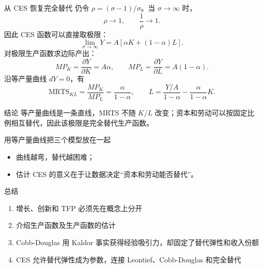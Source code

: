 \documentclass[aspectratio=32]{beamer}
\begin{document}
\begin{frame}{从 CES 恢复完全替代}
\small
\setlength{\abovedisplayskip}{3pt}
\setlength{\belowdisplayskip}{3pt}
仍令 $\rho=(\sigma-1)/\sigma$。当 $\sigma\to\infty$ 时，
\[
\rho\to1,\qquad \frac{1}{\rho}\to1.
\]
因此 CES 函数可以直接取极限：
\[
\lim_{\sigma\to\infty}Y
=A\left[\alpha K+(1-\alpha)L\right].
\]
对极限生产函数求边际产出：
\[
MP_K=\frac{\partial Y}{\partial K}=A\alpha,
\qquad
MP_L=\frac{\partial Y}{\partial L}=A(1-\alpha).
\]
沿等产量曲线 $dY=0$，有
\[
\mathrm{MRTS}_{KL}
=\frac{MP_K}{MP_L}
=\frac{\alpha}{1-\alpha},
\qquad
L=\frac{Y/A}{1-\alpha}
 -\frac{\alpha}{1-\alpha}K.
\]
\vspace{-0.08cm}
\begin{alertblock}{结论}
等产量曲线是一条直线，MRTS 不随 $K/L$ 改变；资本和劳动可以按固定比例相互替代，因此该极限是完全替代生产函数。
\end{alertblock}
\end{frame}

\begin{frame}{用等产量曲线把三个模型放在一起}

\begin{center}
\end{center}

\begin{itemize}
    \item 曲线越弯，替代越困难；
    \item 估计 CES 的意义在于让数据决定“资本和劳动能否替代”。
\end{itemize}
\end{frame}

\begin{frame}{总结}
\begin{enumerate}
    \item 增长、创新和 TFP 必须先在概念上分开
    \item 介绍生产函数及生产函数的估计
    \item Cobb-Douglas 用 Kaldor 事实获得经验吸引力，却固定了替代弹性和收入份额
    \item CES 允许替代弹性成为参数，连接 Leontief、Cobb-Douglas 和完全替代
\end{enumerate}
\end{frame}
\end{document}
